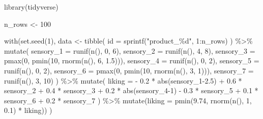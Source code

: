 \documentclass[
]{book}
\newenvironment{Shaded}{\begin{snugshade}}{\end{snugshade}}
\newcommand{\AttributeTok}[1]{\textcolor[rgb]{0.77,0.63,0.00}{#1}}
\newcommand{\DecValTok}[1]{\textcolor[rgb]{0.00,0.00,0.81}{#1}}
\newcommand{\FloatTok}[1]{\textcolor[rgb]{0.00,0.00,0.81}{#1}}
\newcommand{\FunctionTok}[1]{\textcolor[rgb]{0.00,0.00,0.00}{#1}}
\newcommand{\NormalTok}[1]{#1}
\newcommand{\OtherTok}[1]{\textcolor[rgb]{0.56,0.35,0.01}{#1}}
\newcommand{\SpecialCharTok}[1]{\textcolor[rgb]{0.00,0.00,0.00}{#1}}
\newcommand{\StringTok}[1]{\textcolor[rgb]{0.31,0.60,0.02}{#1}}
\begin{document}
\begin{Shaded}
\begin{Highlighting}[]
\FunctionTok{library}\NormalTok{(tidyverse)}

\NormalTok{n\_rows }\OtherTok{\textless{}{-}} \DecValTok{100}

\FunctionTok{with}\NormalTok{(}\FunctionTok{set.seed}\NormalTok{(}\DecValTok{1}\NormalTok{),}
\NormalTok{     data }\OtherTok{\textless{}{-}} \FunctionTok{tibble}\NormalTok{(}
       \AttributeTok{id =} \FunctionTok{sprintf}\NormalTok{(}\StringTok{"product\_\%d"}\NormalTok{, }\DecValTok{1}\SpecialCharTok{:}\NormalTok{n\_rows)}
\NormalTok{     ) }\SpecialCharTok{\%\textgreater{}\%}
       \FunctionTok{mutate}\NormalTok{(}
         \AttributeTok{sensory\_1 =} \FunctionTok{runif}\NormalTok{(}\FunctionTok{n}\NormalTok{(), }\DecValTok{0}\NormalTok{, }\DecValTok{6}\NormalTok{),}
         \AttributeTok{sensory\_2 =} \FunctionTok{runif}\NormalTok{(}\FunctionTok{n}\NormalTok{(), }\DecValTok{4}\NormalTok{, }\DecValTok{8}\NormalTok{),}
         \AttributeTok{sensory\_3 =} \FunctionTok{pmax}\NormalTok{(}\DecValTok{0}\NormalTok{, }\FunctionTok{pmin}\NormalTok{(}\DecValTok{10}\NormalTok{, }\FunctionTok{rnorm}\NormalTok{(}\FunctionTok{n}\NormalTok{(), }\DecValTok{6}\NormalTok{, }\FloatTok{1.5}\NormalTok{))),}
         \AttributeTok{sensory\_4 =} \FunctionTok{runif}\NormalTok{(}\FunctionTok{n}\NormalTok{(), }\DecValTok{0}\NormalTok{, }\DecValTok{2}\NormalTok{),}
         \AttributeTok{sensory\_5 =} \FunctionTok{runif}\NormalTok{(}\FunctionTok{n}\NormalTok{(), }\DecValTok{0}\NormalTok{, }\DecValTok{2}\NormalTok{),}
         \AttributeTok{sensory\_6 =} \FunctionTok{pmax}\NormalTok{(}\DecValTok{0}\NormalTok{, }\FunctionTok{pmin}\NormalTok{(}\DecValTok{10}\NormalTok{, }\FunctionTok{rnorm}\NormalTok{(}\FunctionTok{n}\NormalTok{(), }\DecValTok{3}\NormalTok{, }\DecValTok{1}\NormalTok{))),}
         \AttributeTok{sensory\_7 =} \FunctionTok{runif}\NormalTok{(}\FunctionTok{n}\NormalTok{(), }\DecValTok{3}\NormalTok{, }\DecValTok{10}\NormalTok{)}
\NormalTok{       ) }\SpecialCharTok{\%\textgreater{}\%}
       \FunctionTok{mutate}\NormalTok{(}
         \AttributeTok{liking =} 
           \SpecialCharTok{{-}} \FloatTok{0.2} \SpecialCharTok{*} \FunctionTok{abs}\NormalTok{(sensory\_1}\FloatTok{{-}2.5}\NormalTok{)}
         \SpecialCharTok{+} \FloatTok{0.6} \SpecialCharTok{*}\NormalTok{ sensory\_2}
         \SpecialCharTok{+} \FloatTok{0.4} \SpecialCharTok{*}\NormalTok{ sensory\_3}
         \SpecialCharTok{+} \FloatTok{0.2} \SpecialCharTok{*} \FunctionTok{abs}\NormalTok{(sensory\_4}\DecValTok{{-}1}\NormalTok{)}
         \SpecialCharTok{{-}} \FloatTok{0.3} \SpecialCharTok{*}\NormalTok{ sensory\_5}
         \SpecialCharTok{+} \FloatTok{0.1} \SpecialCharTok{*}\NormalTok{ sensory\_6}
         \SpecialCharTok{+} \FloatTok{0.2} \SpecialCharTok{*}\NormalTok{ sensory\_7}
\NormalTok{       ) }\SpecialCharTok{\%\textgreater{}\%}
       \FunctionTok{mutate}\NormalTok{(}\AttributeTok{liking =} \FunctionTok{pmin}\NormalTok{(}\FloatTok{9.74}\NormalTok{, }\FunctionTok{rnorm}\NormalTok{(}\FunctionTok{n}\NormalTok{(), }\DecValTok{1}\NormalTok{, }\FloatTok{0.1}\NormalTok{) }\SpecialCharTok{*}\NormalTok{ liking))}
\NormalTok{)}


\end{Highlighting}
\end{Shaded}
\end{document}
